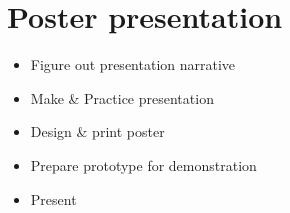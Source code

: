 \section{Poster presentation}
\begin{itemize}
    \item Figure out presentation narrative
    \item Make \& Practice presentation
    \item Design \& print poster
    \item Prepare prototype for demonstration
    \item Present
\end{itemize}